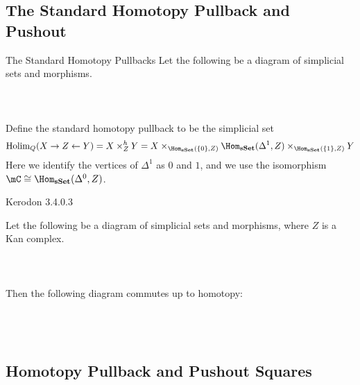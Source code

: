 \documentclass[a4paper]{article}
\begin{document}
\subsection{The Standard Homotopy Pullback and Pushout}
\begin{defn}{The Standard Homotopy Pullbacks}{} Let the following be a diagram of simplicial sets and morphisms. \\~\\
\\~\\
Define the standard homotopy pullback to be the simplicial set $$\text{Holim}_Q(X\rightarrow Z\leftarrow Y)=X\times_Z^hY=X\times_{\Hom_\bold{sSet}(\{0\},Z)}\Hom_\bold{sSet}(\Delta^1,Z)\times_{\Hom_\bold{sSet}(\{1\},Z)}Y$$ Here we identify the vertices of $\Delta^1$ as $0$ and $1$, and we use the isomorphism $\mC\cong\Hom_\bold{sSet}(\Delta^0,Z)$. 
\end{defn}

Kerodon 3.4.0.3

\begin{lmm}{}{} Let the following be a diagram of simplicial sets and morphisms, where $Z$ is a Kan complex. \\~\\
\\~\\
Then the following diagram commutes up to homotopy: \\~\\
\\~\\
\end{lmm}

\subsection{Homotopy Pullback and Pushout Squares}
\end{document}
